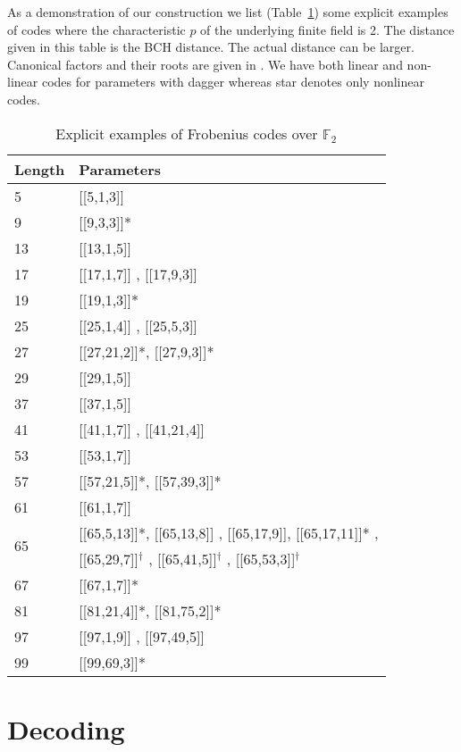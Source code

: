 \documentclass[conference]{IEEEtran}
\renewcommand{\=}{\approx}
\begin{document}
As a demonstration of our construction we list
(Table~\ref{tab:explicit-examples-short}) some explicit examples of
codes where the characteristic $p$ of the underlying finite field is
2. The distance given in this table is the BCH distance.  The actual
distance can be larger. Canonical factors and their roots 
 are given in \cite{dutta2011code}. We have both linear and non-linear codes for parameters with dagger whereas star denotes only nonlinear codes.
\begin{table}[h]
\begin{center}
\begin{tabular}{|l|l|}
\hline
Length & Parameters\\
\hline
5 & [[5,1,3]] \\ 
\hline
9 & [[9,3,3]]* \\
\hline
13 & [[13,1,5]] \\ 
\hline
17 & [[17,1,7]] , [[17,9,3]] \\ 
\hline
19 & [[19,1,3]]* \\
\hline
25 & [[25,1,4]] , [[25,5,3]] \\ 
\hline
27 & [[27,21,2]]*, [[27,9,3]]* \\
\hline
29 & [[29,1,5]] \\ 
\hline
37 & [[37,1,5]] \\ 
\hline
41 & [[41,1,7]] , [[41,21,4]] \\ 
\hline
53 & [[53,1,7]] \\ 
\hline
57 & [[57,21,5]]*, [[57,39,3]]* \\
\hline
61 & [[61,1,7]] \\ 
\hline
\multirow{2}{*}{65} & [[65,5,13]]*, [[65,13,8]] , [[65,17,9]], [[65,17,11]]* ,\\
	& [[65,29,7]]$^\dagger$ , [[65,41,5]]$^\dagger$ , [[65,53,3]]$^\dagger$ \\ 
\hline
67 & [[67,1,7]]* \\
\hline
81 & [[81,21,4]]*, [[81,75,2]]*\\
\hline
97 & [[97,1,9]] , [[97,49,5]] \\ 
\hline
99 & [[99,69,3]]* \\
\hline
\end{tabular}
\vspace{-1mm}
\end{center}
\caption{Explicit examples of Frobenius codes over $\mathbb{F}_2$}
\label{tab:explicit-examples-short}
\vspace{-1cm}
\end{table}
\section{Decoding}
\end{document}
